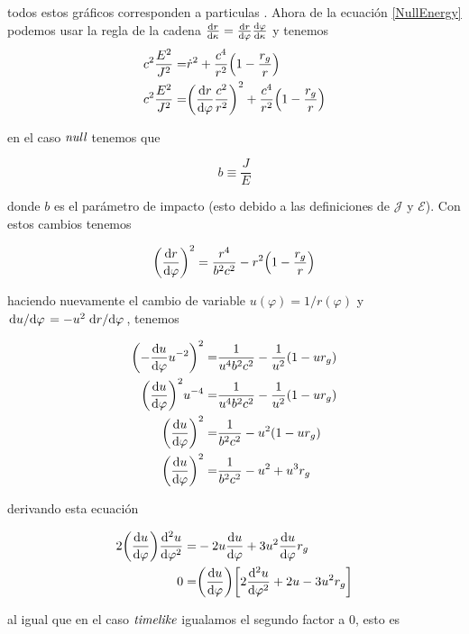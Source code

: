 \documentclass[../Main.tex]{subfiles}
\begin{document}
todos estos gráficos corresponden a particulas \tl. Ahora de la ecuación \eqref{NullEnergy} podemos usar la regla de la cadena $\dv{r}{\kappa}=\dv{r}{\varphi}\dv{\varphi}{\kappa}$ y tenemos
\begin{align*}
    c^{2}\dfrac{E^{2}}{J^{2}} = & \dot{r}^{2} + \dfrac{c^{4}}{r^{2}}\qty(1-\dfrac{r_{g}}{r}) \\
    c^{2}\dfrac{E^{2}}{J^{2}} = & \qty(\dv{r}{\varphi}\dfrac{c^{2}}{r^{2}})^{2} + \dfrac{c^{4}}{r^{2}}\qty(1-\dfrac{r_{g}}{r}) 
\end{align*}

en el caso $\textit{null}$ tenemos que

\begin{equation}
    b \equiv \dfrac{J}{E}
\end{equation}

donde $b$ es el parámetro de impacto (esto debido a las definiciones de $\mathscr{J}$ y $\mathscr{E}$). Con estos cambios tenemos

\begin{equation}
    \qty(\dv{r}{\varphi})^{2} = \dfrac{r^{4}}{b^{2}c^{2}}-r^{2}\qty(1-\dfrac{r_{g}}{r})
    \label{geodesicnullcuadratic}
\end{equation}

haciendo nuevamente el cambio de variable $u(\varphi)=1/r(\varphi)$ y $\dv*{u}{\varphi}= -u^{2}\dv*{r}{\varphi}$, tenemos

\begin{align*}
    \qty(-\dv{u}{\varphi}u^{-2})^{2} = & \dfrac{1}{u^{4}b^{2}c^{2}}-\dfrac{1}{u^{2}}\qty(1-ur_{g}) \\
    \qty(\dv{u}{\varphi})^{2}u^{-4} = & \dfrac{1}{u^{4}b^{2}c^{2}}-\dfrac{1}{u^{2}}\qty(1-ur_{g}) \\
    \qty(\dv{u}{\varphi})^{2} = & \dfrac{1}{b^{2}c^{2}}-u^{2}\qty(1-ur_{g}) \\
    \qty(\dv{u}{\varphi})^{2} = & \dfrac{1}{b^{2}c^{2}}-u^{2}+u^{3}r_{g}
\end{align*}

derivando esta ecuación

\begin{align*}
    2\qty(\dv{u}{\varphi})\dv[2]{u}{\varphi} = & -2u\dv{u}{\varphi} + 3u^{2}\dv{u}{\varphi}r_{g} \\
    0 = & \qty(\dv{u}{\varphi})\qty[2\dv[2]{u}{\varphi}+2u-3u^{2}r_{g}] \\
\end{align*}

al igual que en el caso $\textit{timelike}$ igualamos el segundo factor a 0, esto es
\end{document}

